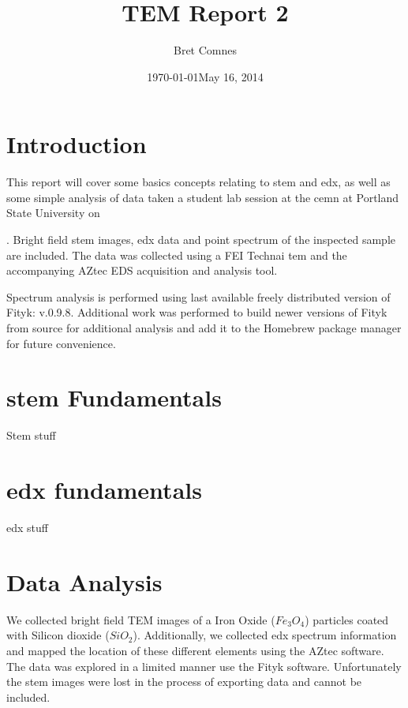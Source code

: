 \documentclass[12pt,a4paper]{article}
\title{TEM Report 2}
\author{Bret Comnes}
\date{\today}
\begin{document}
\maketitle

\section{Introduction} %

This report will cover some basics concepts relating to \ac{stem} and \ac{edx}, as well as some simple analysis of data taken a student lab session at the \ac{cemn} at Portland State University on \date{May 16, 2014}.  Bright field \ac{stem} images, \ac{edx} data and point spectrum of the inspected sample are included.  The data was collected using a FEI Technai \ac{tem} and the accompanying AZtec EDS acquisition and analysis tool.

Spectrum analysis is performed using last available freely distributed version of Fityk\cite{ft}: v.0.9.8.  Additional work was performed to build newer versions of Fityk from source for additional analysis  and add it to the Homebrew\cite{HB} package manager for future convenience.


\section{\ac{stem} Fundamentals} %
\label{sec:stem}

Stem stuff



\section{\ac{edx} fundamentals} %
\label{sec:edx}

edx stuff


\section{Data Analysis} %
\label{sec:data_analysis}

We collected bright field TEM images of a Iron Oxide ($Fe_3O_4$) particles coated with Silicon dioxide ($SiO_2$).  Additionally, we collected \ac{edx} spectrum information and mapped the location of these different elements using the AZtec software.  The data was explored in a limited manner use the Fityk software.  Unfortunately the \ac{stem} images were lost in the process of exporting data and cannot be included.
\end{document}
